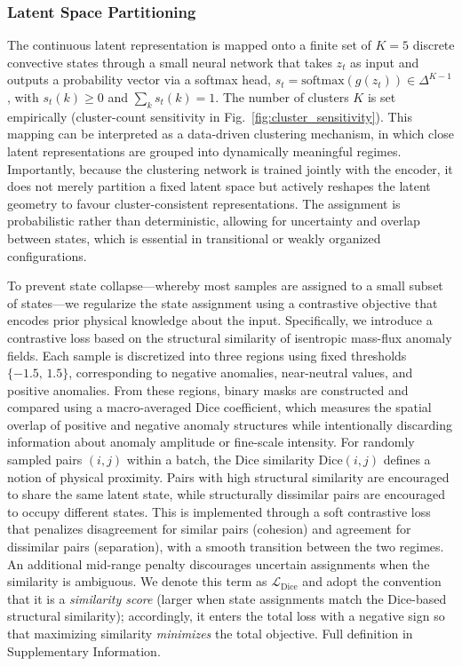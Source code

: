 \documentclass[11pt]{article}
\begin{document}
\subsubsection{Latent Space Partitioning}

The continuous latent representation is mapped onto a finite set of $K=5$ discrete convective states through a small neural network that takes $z_t$ as input and outputs a probability vector via a softmax head, $s_t = \mathrm{softmax}(g(z_t)) \in \Delta^{K-1}$, with $s_t(k)\ge 0$ and $\sum_k s_t(k)=1$. The number of clusters $K$ is set empirically (cluster-count sensitivity in Fig.~\ref{fig:cluster_sensitivity}). This mapping can be interpreted as a data-driven clustering mechanism, in which close latent representations are grouped into dynamically meaningful regimes. Importantly, because the clustering network is trained jointly with the encoder, it does not merely partition a fixed latent space but actively reshapes the latent geometry to favour cluster-consistent representations. The assignment is probabilistic rather than deterministic, allowing for uncertainty and overlap between states, which is essential in transitional or weakly organized configurations.

To prevent state collapse—whereby most samples are assigned to a small subset of states—we regularize the state assignment using a contrastive objective that encodes prior physical knowledge about the input. Specifically, we introduce a contrastive loss based on the structural similarity of isentropic mass-flux anomaly fields. Each sample is discretized into three regions using fixed thresholds $\{-1.5,\,1.5\}$, corresponding to negative anomalies, near-neutral values, and positive anomalies. From these regions, binary masks are constructed and compared using a macro-averaged Dice coefficient, which measures the spatial overlap of positive and negative anomaly structures while intentionally discarding information about anomaly amplitude or fine-scale intensity. For randomly sampled pairs $(i,j)$ within a batch, the Dice similarity $\mathrm{Dice}(i,j)$ defines a notion of physical proximity. Pairs with high structural similarity are encouraged to share the same latent state, while structurally dissimilar pairs are encouraged to occupy different states. This is implemented through a soft contrastive loss that penalizes disagreement for similar pairs (cohesion) and agreement for dissimilar pairs (separation), with a smooth transition between the two regimes. An additional mid-range penalty discourages uncertain assignments when the similarity is ambiguous. We denote this term as $\mathcal{L}_{\mathrm{Dice}}$ and adopt the convention that it is a \emph{similarity score} (larger when state assignments match the Dice-based structural similarity); accordingly, it enters the total loss with a negative sign so that maximizing similarity \emph{minimizes} the total objective. Full definition in Supplementary Information.
\end{document}
